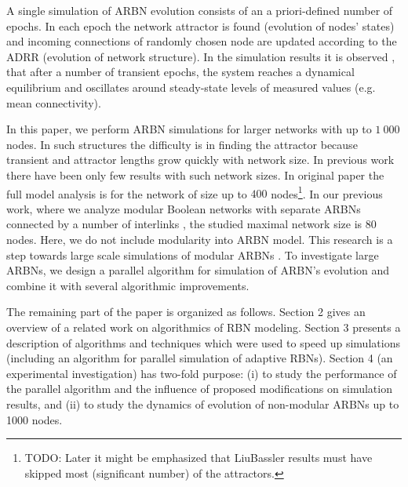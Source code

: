 \documentclass[procedia]{easychair}
\begin{document}
	A single simulation of ARBN evolution consists of an a priori-defined number of epochs. In each epoch the network attractor is found (evolution of nodes' states) and incoming connections of randomly chosen node are updated according to the ADRR (evolution of network structure). 
	In the simulation results it is observed \cite{mlb,Gorski2016}, that after a number of transient epochs, the system reaches a dynamical equilibrium and oscillates around steady-state levels of measured values (e.g. mean connectivity). 
	
	In this paper, we perform ARBN simulations for larger networks with up to $1~000$ nodes. 
	In such structures the difficulty is in finding the attractor because transient and attractor lengths grow quickly with network size. 
	In previous work there have been only few results with such network sizes. In original paper \cite{mlb} the full model analysis is for the network of size up to $400$ nodes\footnote{TODO: Later it might be emphasized that LiuBassler results must have skipped most (significant number) of the attractors.}. 
	In our previous work, where we analyze modular Boolean networks with separate ARBNs connected by a number of interlinks \cite{Gorski2016}, the studied maximal network size is $80$ nodes. 
	Here, we do not include modularity into ARBN model. 
	This research is a step towards large scale simulations of modular ARBNs \cite{Gorski2016}. To investigate large ARBNs, we design a parallel algorithm for simulation of ARBN's evolution and combine it with several algorithmic improvements.
	
	The remaining part of the paper is organized as follows. Section 2 gives an overview of a related work on algorithmics of RBN modeling. Section 3 presents a description of algorithms and techniques which were used to speed up simulations (including an algorithm for parallel simulation of adaptive RBNs). Section 4 (an experimental investigation) has two-fold purpose: (i) to study the performance of the parallel algorithm and the influence of proposed modifications on simulation results, and (ii) to study the dynamics of evolution of non-modular ARBNs up to 1000 nodes.

\end{document}
